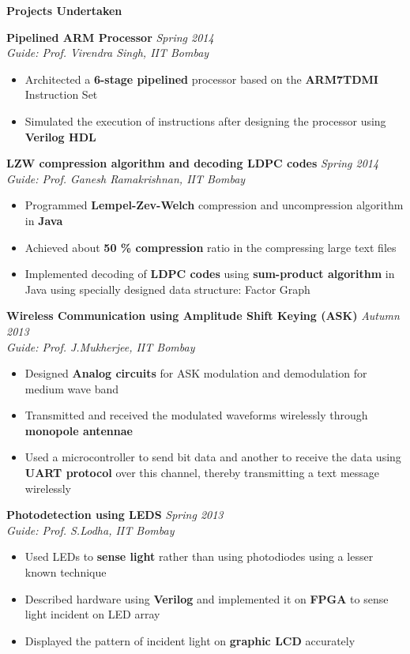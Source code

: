 \documentclass[a4paper,10pt]{article}
\newcommand{\resheading}[1]{
	{\large \colorbox{mygrey}{\begin{minipage}{\textwidth}{\textbf{#1 \vphantom{p\^{E}}}}\end{minipage}}}
}
\newcommand{\ressubheadingWithGuide}[3]{%

	\textbf{#1} \hfill \textit{#2}\null\\
	\textit{\small #3} %
	\vspace{-4pt}
}
\begin{document}
\resheading{Projects Undertaken}
    		\ressubheadingWithGuide{Pipelined ARM Processor}{\textit{Spring 2014}}{Guide: Prof. Virendra Singh, IIT Bombay}
            	\begin{itemize}\itemsep -1pt
            	\item Architected a \textbf{6-stage pipelined} processor based on the \textbf{ARM7TDMI} Instruction Set
				\item Simulated the execution of instructions after designing the processor using \textbf{Verilog HDL}
            	\end{itemize}

    		\ressubheadingWithGuide{LZW compression algorithm and decoding LDPC codes}{\textit{Spring 2014}}{Guide: Prof. Ganesh Ramakrishnan, IIT Bombay}
            	\begin{itemize}\itemsep -1pt
            	\item Programmed \textbf{Lempel-Zev-Welch} compression and uncompression algorithm in \textbf{Java}
				\item Achieved about \textbf{50 \% compression} ratio in the compressing large text files
				\item Implemented decoding of \textbf{LDPC codes} using \textbf{sum-product algorithm} in Java using specially designed data structure: Factor Graph
            	\end{itemize}



        	\ressubheadingWithGuide{Wireless Communication using Amplitude Shift Keying (ASK)}{\textit{Autumn 2013}}{Guide: Prof. J.Mukherjee, IIT Bombay}
            	\begin{itemize}\itemsep -1pt
                \item Designed \textbf{Analog circuits} for ASK modulation and demodulation for medium wave band
                \item Transmitted and received the modulated waveforms wirelessly through  \textbf{monopole antennae}
                \item Used a microcontroller to send bit data and another to receive the data using \textbf{UART protocol} over this channel, thereby transmitting a text message wirelessly
                \end{itemize}

        	\ressubheadingWithGuide{Photodetection using LEDS}{\textit{Spring 2013}}{Guide: Prof. S.Lodha, IIT Bombay}
        		\begin{itemize}\itemsep -1pt
        		\item Used LEDs to \textbf{sense light} rather than using photodiodes using a lesser known technique
				\item Described hardware using \textbf{Verilog} and implemented it on \textbf{FPGA} to sense light incident on LED array
				\item Displayed the pattern of incident light on \textbf{graphic LCD} accurately
				\end{itemize}
\end{document}
